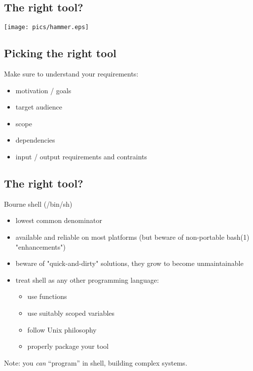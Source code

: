 \documentclass[xga]{xdvislides}
\begin{document}
\subsection{The right tool?}
\vspace*{\fill}
\begin{center}
	\texttt{[image: pics/hammer.eps]}
\end{center}
\vspace*{\fill}

\subsection{Picking the right tool}
Make sure to understand your requirements:

\begin{itemize}
	\item motivation / goals
	\item target audience
	\item scope
	\item dependencies
	\item input / output requirements and contraints
\end{itemize}


\subsection{The right tool?}
Bourne shell (/bin/sh) \\

\begin{itemize}
	\item lowest common denominator
	\item available and reliable on most platforms (but beware of non-portable
		bash(1) "enhancements")
	\item beware of "quick-and-dirty" solutions, they grow to become
		unmaintainable
	\item treat shell as any other programming language:
		\begin{itemize}
			\item use functions
			\item use suitably scoped variables
			\item follow Unix philosophy
			\item properly package your tool
		\end{itemize}
\end{itemize}

Note: you {\em can} ``program'' in shell, building complex
systems.
\end{document}

